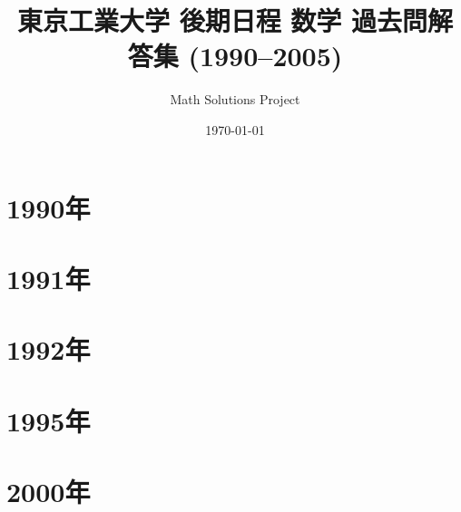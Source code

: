 \documentclass[ltjsarticle,10pt,a4paper]{ltjsarticle}
\title{東京工業大学 後期日程 数学 過去問解答集 (1990--2005)}
\author{Math Solutions Project}
\date{\today}
\begin{document}
\maketitle
\tableofcontents
\clearpage

\part*{1990年}

\clearpage

\clearpage

\part*{1991年}

\clearpage

\clearpage

\part*{1992年}

\clearpage

\clearpage

\part*{1995年}

\clearpage

\clearpage

\part*{2000年}

\clearpage

\clearpage
\end{document}
